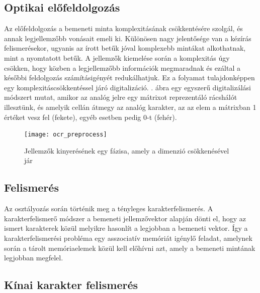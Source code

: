 \subsection{Optikai előfeldolgozás}

Az előfeldolgozás a bemeneti minta komplexitásának csökkentésére szolgál, és annak legjellemzőbb vonásait emeli ki. Különösen nagy jelentősége van a kézírás felismerésekor, ugyanis az írott betűk jóval komplexebb mintákat alkothatnak, mint a nyomtatott betűk. A jellemzők kiemelése során a komplexitás úgy csökken, hogy közben a legjellemzőbb információk megmaradnak és ezáltal a későbbi feldolgozás számításigényét redukálhatjuk. Ez a folyamat tulajdonképpen egy komplexitáscsökkentéssel járó digitalizáció. . ábra egy egyszerű digitalizálási módszert mutat, amikor az analóg jelre egy mátrixot reprezentáló rácshálót illesztünk, és amelyik cellán átmegy az analóg karakter, az az elem a mátrixban 1 értéket vesz fel (fekete), egyéb esetben pedig 0-t (fehér).

\begin{figure}[h]
\centering
\texttt{[image: ocr\_preprocess]}
\caption{Jellemzők kinyerésének egy fázisa, amely a dimenzió csökkenésével jár}
\label{fig:ocr_preprocess}
\end{figure}

\subsection{Felismerés}

Az osztályozás során történik meg a tényleges karakterfelismerés. A karakterfelismerő módszer a bemeneti jellemzővektor alapján dönti el, hogy az ismert karakterek közül melyikre hasonlít a legjobban a bemeneti vektor. Így a karakterfelismerési probléma egy asszociatív memóriát igénylő feladat, amelynek során a tárolt memóriaelemek közül kell előhívni azt, amely a bemeneti mintának legjobban megfelel.\\

\subsection{Kínai karakter felismerés}

